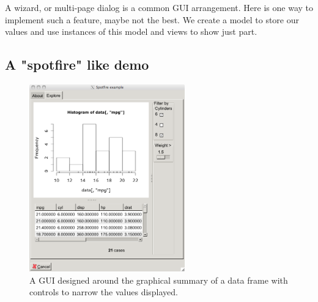 \documentclass{article}
\begin{document}
A wizard, or multi-page dialog is a common GUI arrangement. Here is
one way to implement such a feature, maybe not the best. We create a
model to store our values and use instances of this model and views
to show just part.
\begin{Schunk}
\end{Schunk}
                 
\subsection{A "spotfire" like demo}
\label{sec:spotfire-like-demo}

\begin{figure}
  \centering
  \includegraphics[width=0.6\textwidth]{spotfire}
  \caption{A GUI designed around the graphical summary of a data frame with controls to narrow the values displayed. }
  \label{fig:spotfire}
\end{figure}
\end{document}
